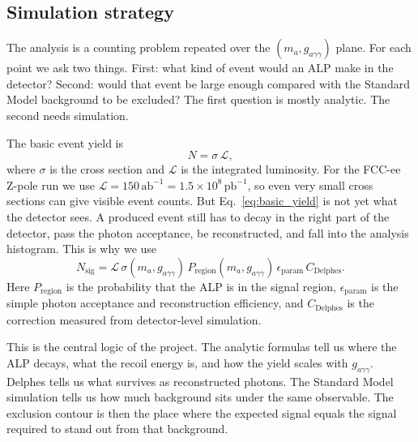 \documentclass[12pt,a4paper]{article}
\begin{document}
\subsection{Simulation strategy}

The analysis is a counting problem repeated over the
$(m_{a},g_{a\gamma\gamma})$ plane. For each point we ask two things. First:
what kind of event would an ALP make in the detector? Second: would that event
be large enough compared with the Standard Model background to be excluded?
The first question is mostly analytic. The second needs simulation.

The basic event yield is
\begin{equation}
    N = \sigma\,\mathcal{L},
    \label{eq:basic_yield}
\end{equation}
where $\sigma$ is the cross section and $\mathcal{L}$ is the integrated
luminosity. For the FCC-ee Z-pole run we use
$\mathcal{L}=150\,\text{ab}^{-1}=1.5\times10^8\,\text{pb}^{-1}$, so even very
small cross sections can give visible event counts. But Eq.~\eqref{eq:basic_yield}
is not yet what the detector sees. A produced event still has to decay in the
right part of the detector, pass the photon acceptance, be reconstructed, and
fall into the analysis histogram. This is why we use
\begin{equation}
    N_\mathrm{sig}
    =
    \mathcal{L}\,
    \sigma(m_{a},g_{a\gamma\gamma})\,
    P_\mathrm{region}(m_{a},g_{a\gamma\gamma})\,
    \epsilon_\mathrm{param}\,
    C_\mathrm{Delphes}.
    \label{eq:nsig}
\end{equation}
Here $P_\mathrm{region}$ is the probability that the ALP is in the signal
region, $\epsilon_\mathrm{param}$ is the simple photon acceptance and
reconstruction efficiency, and $C_\mathrm{Delphes}$ is the correction measured
from detector-level simulation.

This is the central logic of the project. The analytic formulas tell us where
the ALP decays, what the recoil energy is, and how the yield scales with
$g_{a\gamma\gamma}$. Delphes tells us what survives as reconstructed photons.
The Standard Model simulation tells us how much background sits under the same
observable. The exclusion contour is then the place where the expected signal
equals the signal required to stand out from that background.
\end{document}
